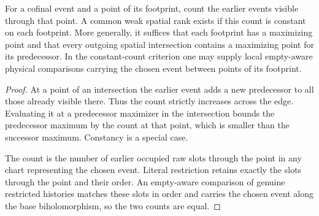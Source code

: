 \begin{theorem}
\label{hir:g8-local-predecessor-count-rank}
\leanok
For a cofinal event and a point of its footprint, count the earlier
events visible through that point. A common weak spatial rank exists
if this count is constant on each footprint. More generally, it
suffices that each footprint has a maximizing point and that every
outgoing spatial intersection contains a maximizing point for its
predecessor. In the constant-count criterion one may supply local
empty-aware physical comparisons carrying the chosen event between
points of its footprint.
\end{theorem}
\begin{proof}
At a point of an intersection the earlier event adds a new
predecessor to all those already visible there. Thus the count
strictly increases across the edge. Evaluating it at a predecessor
maximizer in the intersection bounds the predecessor maximum by
the count at that point, which is smaller than the successor
maximum. Constancy is a special case.

The count is the number of earlier occupied raw slots through the
point in any chart representing the chosen event. Literal
restriction retains exactly the slots through the point and their
order. An empty-aware comparison of genuine restricted histories
matches these slots in order and carries the chosen event along
the base biholomorphism, so the two counts are equal.
\end{proof}

